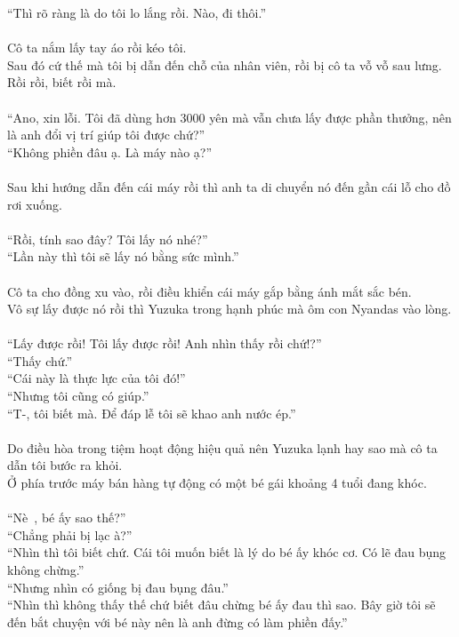 \documentclass[12pt,a4paper, twosides]{book}
\begin{document}
“Thì rõ ràng là do tôi lo lắng rồi. Nào, đi thôi.”\\
\\
Cô ta nắm lấy tay áo rồi kéo tôi.\\
Sau đó cứ thế mà tôi bị dẫn đến chỗ của nhân viên, rồi bị cô ta vỗ vỗ sau lưng.\\
Rồi rồi, biết rồi mà.\\
\\
“Ano, xin lỗi. Tôi đã dùng hơn 3000 yên mà vẫn chưa lấy được phần thưởng, nên là anh đổi vị trí giúp tôi được chứ?”\\
“Không phiền đâu ạ. Là máy nào ạ?”\\
\\
Sau khi hướng dẫn đến cái máy rồi thì anh ta di chuyển nó đến gần cái lỗ cho đồ rơi xuống.\\
\\
“Rồi, tính sao đây? Tôi lấy nó nhé?”\\
“Lần này thì tôi sẽ lấy nó bằng sức mình.”\\
\\
Cô ta cho đồng xu vào, rồi điều khiển cái máy gắp bằng ánh mắt sắc bén.\\
Vô sự lấy được nó rồi thì Yuzuka trong hạnh phúc mà ôm con Nyandas vào lòng.\\
\\
“Lấy được rồi! Tôi lấy được rồi! Anh nhìn thấy rồi chứ!?”\\
“Thấy chứ.”\\
“Cái này là thực lực của tôi đó!”\\
“Nhưng tôi cũng có giúp.”\\
“T-, tôi biết mà. Để đáp lễ tôi sẽ khao anh nước ép.”\\
\\
Do điều hòa trong tiệm hoạt động hiệu quả nên Yuzuka lạnh hay sao mà cô ta dẫn tôi bước ra khỏi.\\
Ở phía trước máy bán hàng tự động có một bé gái khoảng 4 tuổi đang khóc.\\
\\
“Nè~, bé ấy sao thế?”\\
“Chẳng phải bị lạc à?”\\
“Nhìn thì tôi biết chứ. Cái tôi muốn biết là lý do bé ấy khóc cơ. Có lẽ đau bụng không chừng.”\\
“Nhưng nhìn có giống bị đau bụng đâu.”\\
“Nhìn thì không thấy thế chứ biết đâu chừng bé ấy đau thì sao. Bây giờ tôi sẽ đến bắt chuyện với bé này nên là anh đừng có làm phiền đấy.”\\
\end{document}
